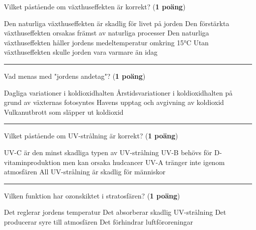 \documentclass{exam}
\begin{document}
\vspace{5mm}
\begin{center}
\end{center}
\begin{questions}
\vspace{5mm} 

\question Vilket påstående om växthuseffekten är korrekt? (\textbf{1 poäng})
\begin{checkboxes}
    \choice Den naturliga växthuseffekten är skadlig för livet på jorden
    \choice Den förstärkta växthuseffekten orsakas främst av naturliga processer
    \CorrectChoice Den naturliga växthuseffekten håller jordens medeltemperatur omkring 15°C
    \choice Utan växthuseffekten skulle jorden vara varmare än idag
\end{checkboxes}

\vspace{5mm} 
\hrule 
\vspace{5mm} 

\question Vad menas med "jordens andetag"? (\textbf{1 poäng})
\begin{checkboxes}
    \choice Dagliga variationer i koldioxidhalten
    \CorrectChoice Årstidsvariationer i koldioxidhalten på grund av växternas fotosyntes
    \choice Havens upptag och avgivning av koldioxid
    \choice Vulkanutbrott som släpper ut koldioxid
\end{checkboxes}

\vspace{5mm} 
\hrule 
\vspace{5mm} 

\question Vilket påstående om UV-strålning är korrekt? (\textbf{1 poäng})
\begin{checkboxes}
    \choice UV-C är den minst skadliga typen av UV-strålning
    \CorrectChoice UV-B behövs för D-vitaminproduktion men kan orsaka hudcancer
    \choice UV-A tränger inte igenom atmosfären
    \choice All UV-strålning är skadlig för människor
\end{checkboxes}

\vspace{5mm} 
\hrule 
\vspace{5mm} 

\question Vilken funktion har ozonskiktet i stratosfären? (\textbf{1 poäng})
\begin{checkboxes}
    \choice Det reglerar jordens temperatur
    \CorrectChoice Det absorberar skadlig UV-strålning
    \choice Det producerar syre till atmosfären
    \choice Det förhindrar luftföroreningar
\end{checkboxes}


\end{questions}
\end{document}
